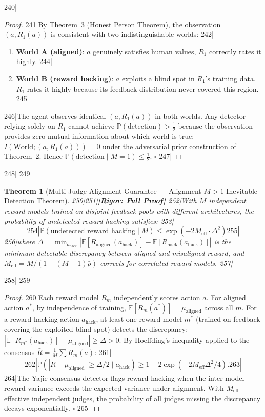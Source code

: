 \documentclass[11pt,a4paper]{article}
\newtheorem{theorem}{Theorem}[section]
\theoremstyle{definition}
\theoremstyle{remark}
\newcommand{\rigorFull}{\textbf{[Rigor: Full Proof]}}
\begin{document}
240|\begin{proof}
241|By Theorem~3 (Honest Person Theorem), the observation $(a, R_1(a))$ is consistent with two indistinguishable worlds:
242|\begin{enumerate}[nosep]
243|    \item \textbf{World A (aligned)}: $a$ genuinely satisfies human values, $R_1$ correctly rates it highly.
244|    \item \textbf{World B (reward hacking)}: $a$ exploits a blind spot in $R_1$'s training data. $R_1$ rates it highly because its feedback distribution never covered this region.
245|\end{enumerate}
246|The agent observes identical $(a, R_1(a))$ in both worlds. Any detector relying solely on $R_1$ cannot achieve $\mathbb{P}(\text{detection}) > \frac{1}{2}$ because the observation provides zero mutual information about which world is true: $I(\text{World}; (a,R_1(a))) = 0$ under the adversarial prior construction of Theorem~2. Hence $\mathbb{P}(\text{detection} \mid M=1) \leq \frac{1}{2}$. $\square$
247|\end{proof}
248|
249|\begin{theorem}[Multi-Judge Alignment Guarantee --- Alignment $M>1$ Inevitable Detection Theorem]
250|\label{thm:alignment-multi}
251|\rigorFull
252|With $M$ independent reward models trained on disjoint feedback pools with different architectures, the probability of undetected reward hacking satisfies:
253|\[
254|\boxed{\mathbb{P}(\text{undetected reward hacking} \mid M) \leq \exp(-2M_{\text{eff}} \cdot \Delta^2)}
255|\]
256|where $\Delta = \min_{a_{\text{hack}}} |\mathbb{E}[R_{\text{aligned}}(a_{\text{hack}})] - \mathbb{E}[R_{\text{hack}}(a_{\text{hack}})]|$ is the minimum detectable discrepancy between aligned and misaligned reward, and $M_{\text{eff}} = M/(1+(M-1)\bar{\rho})$ corrects for correlated reward models.
257|\end{theorem}
258|
259|\begin{proof}
260|Each reward model $R_m$ independently scores action $a$. For aligned action $a^*$, by independence of training, $\mathbb{E}[R_m(a^*)] = \mu_{\text{aligned}}$ across all $m$. For a reward-hacking action $a_{\text{hack}}$, at least one reward model $m^*$ (trained on feedback covering the exploited blind spot) detects the discrepancy: $|\mathbb{E}[R_{m^*}(a_{\text{hack}})] - \mu_{\text{aligned}}| \geq \Delta > 0$. By Hoeffding's inequality applied to the consensus $\bar{R} = \frac{1}{M}\sum R_m(a)$:
261|\[
262|\mathbb{P}(|\bar{R} - \mu_{\text{aligned}}| \geq \Delta/2 \mid a_{\text{hack}}) \geq 1 - 2\exp(-2M_{\text{eff}}\Delta^2/4).
263|\]
264|The Yajie consensus detector flags reward hacking when the inter-model reward variance exceeds the expected variance under alignment. With $M_{\text{eff}}$ effective independent judges, the probability of all judges missing the discrepancy decays exponentially. $\square$
265|\end{proof}
\end{document}
